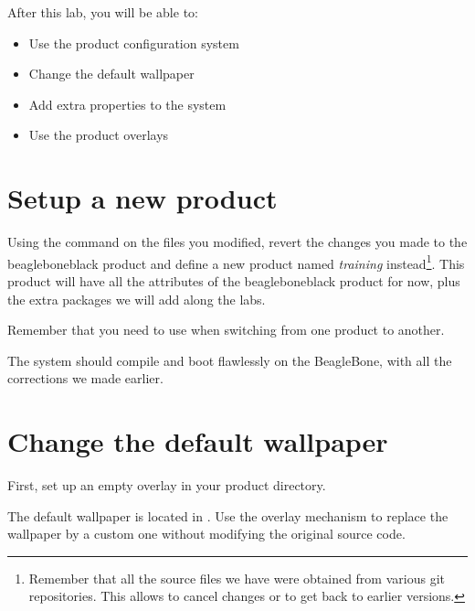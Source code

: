 
After this lab, you will be able to:
\begin{itemize}
  \item Use the product configuration system
  \item Change the default wallpaper
  \item Add extra properties to the system
  \item Use the product overlays
\end{itemize}

\section{Setup a new product}

Using the  command on the files you modified,
revert the changes you made to the beagleboneblack product and define
a new product named \textit{training} instead\footnote{Remember that
  all the source files we have were obtained from various git
  repositories. This allows to cancel changes or to get back to
  earlier versions.}.  This product will have all the attributes of
the beagleboneblack product for now, plus the extra packages we will
add along the labs.

Remember that you need to use  when switching
from one product to another.

The system should compile and boot flawlessly on the BeagleBone, with
all the corrections we made earlier.

\section{Change the default wallpaper}

First, set up an empty overlay in your product directory.

The default wallpaper is located in .
Use the overlay mechanism to replace the wallpaper by a custom one without
modifying the original source code.
